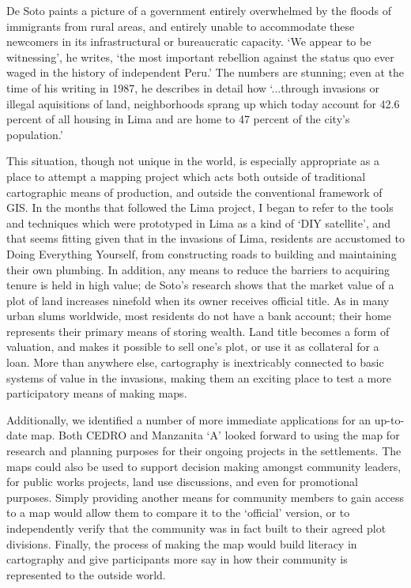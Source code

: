 \documentclass[11pt,oneside,notitlepage]{report}
\begin{document}
De Soto paints a picture of a government entirely overwhelmed by the floods of immigrants from rural areas, and entirely unable to accommodate these newcomers in its infrastructural or bureaucratic capacity. `We appear to be witnessing', he writes, `the most important rebellion against the status quo ever waged in the history of independent Peru.' The numbers are stunning; even at the time of his writing in 1987, he describes in detail how `...through invasions or illegal aquisitions of land, neighborhoods sprang up which today account for 42.6 percent of all housing in Lima and are home to 47 percent of the city's population.' \cite{desoto1987sendero}

This situation, though not unique in the world, is especially appropriate as a place to attempt a mapping project which acts both outside of traditional cartographic means of production, and outside the conventional framework of GIS. In the months that followed the Lima project, I began to refer to the tools and techniques which were prototyped in Lima as a kind of `DIY satellite', and that seems fitting given that in the invasions of Lima, residents are accustomed to Doing Everything Yourself, from constructing roads to building and maintaining their own plumbing. In addition, any means to reduce the barriers to acquiring tenure is held in high value; de Soto's research shows that the market value of a plot of land increases ninefold when its owner receives official title. As in many urban slums worldwide, most residents do not have a bank account; their home represents their primary means of storing wealth. Land title becomes a form of valuation, and makes it possible to sell one's plot, or use it as collateral for a loan. More than anywhere else, cartography is inextricably connected to basic systems of value in the invasions, making them an exciting place to test a more participatory means of making maps. 

Additionally, we identified a number of more immediate applications for an up-to-date map. Both CEDRO and Manzanita `A' looked forward to using the map for research and planning purposes for their ongoing projects in the settlements. The maps could also be used to support decision making amongst community leaders, for public works projects, land use discussions, and even for promotional purposes. Simply providing another means for community members to gain access to a map would allow them to compare it to the `official' version, or to independently verify that the community was in fact built to their agreed plot divisions. Finally, the process of making the map would build literacy in cartography and give participants more say in how their community is represented to the outside world.  
\end{document}
